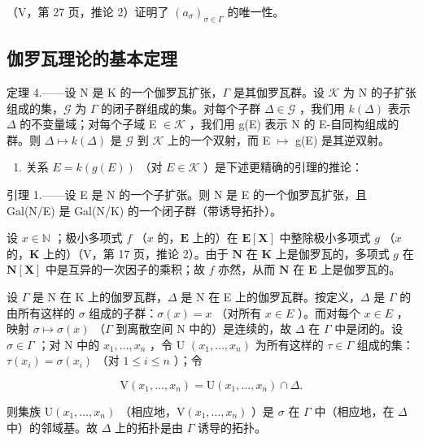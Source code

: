 （V，第 27 页，推论 2）证明了 \((a_{\sigma})_{\sigma \in \Gamma}\) 的唯一性。

\subsection{伽罗瓦理论的基本定理}

定理 4.——设 N 是 K 的一个伽罗瓦扩张，\(\Gamma\) 是其伽罗瓦群。设 \(\mathcal{K}\) 为 N 的子扩张组成的集，\(\mathcal{G}\) 为 \(\Gamma\) 的闭子群组成的集。对每个子群 \(\Delta \in \mathcal{G}\) ，我们用 \(k(\Delta)\) 表示 \(\Delta\) 的不变量域；对每个子域 E \(\in \mathcal{K}\) ，我们用 g(E) 表示 N 的 E-自同构组成的群。则 \(\Delta \mapsto k(\Delta)\) 是 \(\mathcal{G}\) 到 \(\mathcal{K}\) 上的一个双射，而 E \(\mapsto\) g(E) 是其逆双射。

\begin{enumerate}
\def\labelenumi{\Alph{enumi})}
\tightlist
\item
  关系 \(E = k(g(E))\) （对 \(E \in \mathcal{K}\) ）是下述更精确的引理的推论：
\end{enumerate}

引理 1.——设 E 是 N 的一个子扩张。则 N 是 E 的一个伽罗瓦扩张，且 Gal(N/E) 是 Gal(N/K) 的一个闭子群（带诱导拓扑）。

设 \(x \in \mathbb{N}\) ；极小多项式 \(f\) （\(x\) 的，\(\mathbf{E}\) 上的）在 \(\mathbf{E}[\mathbf{X}]\) 中整除极小多项式 \(g\) （\(x\) 的，\(\mathbf{K}\) 上的）（V，第 17 页，推论 2）。由于 \(\mathbf{N}\) 在 \(\mathbf{K}\) 上是伽罗瓦的，多项式 \(g\) 在 \(\mathbf{N}[\mathbf{X}]\) 中是互异的一次因子的乘积；故 \(f\) 亦然，从而 \(\mathbf{N}\) 在 \(\mathbf{E}\) 上是伽罗瓦的。

设 \(\Gamma\) 是 N 在 K 上的伽罗瓦群，\(\Delta\) 是 N 在 E 上的伽罗瓦群。按定义，\(\Delta\) 是 \(\Gamma\) 的由所有这样的 \(\sigma\) 组成的子群：\(\sigma(x) = x\) （对所有 \(x \in E\) ）。而对每个 \(x \in E\) ，映射 \(\sigma \mapsto \sigma(x)\) （\(\Gamma\) 到离散空间 N 中的）是连续的，故 \(\Delta\) 在 \(\Gamma\) 中是闭的。设 \(\sigma \in \Gamma\) ；对 N 中的 \(x_1, \ldots, x_n\) ，令 U \((x_1, \ldots, x_n)\) 为所有这样的 \(\tau \in \Gamma\) 组成的集：\(\tau(x_i) = \sigma(x_i)\) （对 \(1 \leqslant i \leqslant n\) ）；令

\[
\mathrm{V} \left(x _ {1}, \dots , x _ {n}\right) = \mathrm{U} \left(x _ {1}, \dots , x _ {n}\right) \cap \Delta .
\]

则集族 \(\mathrm{U}(x_{1},\ldots,x_{n})\) （相应地，\(\mathrm{V}(x_{1},\ldots,x_{n})\) ）是 \(\sigma\) 在 \(\Gamma\) 中（相应地，在 \(\Delta\) 中）的邻域基。故 \(\Delta\) 上的拓扑是由 \(\Gamma\) 诱导的拓扑。

